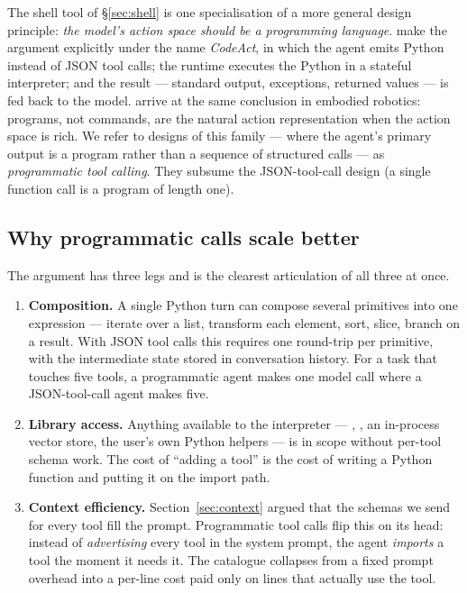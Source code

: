 The shell tool of \S\ref{sec:shell} is one specialisation of a more
general design principle: \emph{the model's action space should be a
programming language}. \citet{wang2024codeact} make the argument
explicitly under the name \emph{CodeAct}, in which the agent emits
Python instead of JSON tool calls; the runtime executes the Python
in a stateful interpreter; and the result --- standard output,
exceptions, returned values --- is fed back to the model.
\citet{liang2023codeaspolicies} arrive at the same conclusion in
embodied robotics: programs, not commands, are the natural action
representation when the action space is rich. We refer to designs
of this family --- where the agent's primary output is a program
rather than a sequence of structured calls --- as
\emph{programmatic tool calling}. They subsume the JSON-tool-call
design (a single function call is a program of length one).

\subsection{Why programmatic calls scale better}
\label{sec:codeact-why}

The argument has three legs and \citet{anthropic2025mcpcode} is the
clearest articulation of all three at once.

\begin{enumerate}[label=(\arabic*),leftmargin=2em,itemsep=0.4em]
\item \textbf{Composition.} A single Python turn can compose several
  primitives into one expression --- iterate over a list, transform
  each element, sort, slice, branch on a result. With JSON tool
  calls this requires one round-trip per primitive, with the
  intermediate state stored in conversation history. For a task
  that touches five tools, a programmatic agent makes one model call
  where a JSON-tool-call agent makes five.
\item \textbf{Library access.} Anything available to the interpreter
  --- , , an in-process vector store, the
  user's own Python helpers --- is in scope without per-tool schema
  work. The cost of ``adding a tool'' is the cost of writing a
  Python function and putting it on the import path.
\item \textbf{Context efficiency.}
  Section~\ref{sec:context} argued that the schemas we send for
  every tool fill the prompt. Programmatic tool calls flip this on
  its head: instead of \emph{advertising} every tool in the system
  prompt, the agent \emph{imports} a tool the moment it needs it.
  The catalogue collapses from a fixed prompt overhead into a
  per-line cost paid only on lines that actually use the tool.
\end{enumerate}


